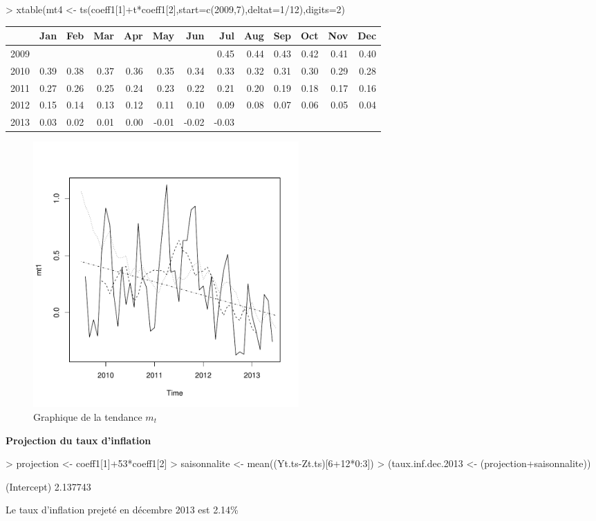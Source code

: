 \documentclass{article}
\begin{document}
\begin{Schunk}
\begin{Sinput}
> xtable(mt4 <- ts(coeff1[1]+t*coeff1[2],start=c(2009,7),deltat=1/12),digits=2)
\end{Sinput}
\begin{table}[ht]
\centering
\begin{tabular}{rrrrrrrrrrrrr}
  \hline
 & Jan & Feb & Mar & Apr & May & Jun & Jul & Aug & Sep & Oct & Nov & Dec \\ 
  \hline
2009 &  &  &  &  &  &  & 0.45 & 0.44 & 0.43 & 0.42 & 0.41 & 0.40 \\ 
  2010 & 0.39 & 0.38 & 0.37 & 0.36 & 0.35 & 0.34 & 0.33 & 0.32 & 0.31 & 0.30 & 0.29 & 0.28 \\ 
  2011 & 0.27 & 0.26 & 0.25 & 0.24 & 0.23 & 0.22 & 0.21 & 0.20 & 0.19 & 0.18 & 0.17 & 0.16 \\ 
  2012 & 0.15 & 0.14 & 0.13 & 0.12 & 0.11 & 0.10 & 0.09 & 0.08 & 0.07 & 0.06 & 0.05 & 0.04 \\ 
  2013 & 0.03 & 0.02 & 0.01 & 0.00 & -0.01 & -0.02 & -0.03 &  &  &  &  &  \\ 
   \hline
\end{tabular}
\end{table}\end{Schunk}
\clearpage 
\begin{figure}[p]
  \centering
  \includegraphics[height=4in, width=4in]{exercice1-graph4.pdf}
  \caption{Graphique de la tendance $m_t$}
  \label{fig:exercice1-graph4}
\end{figure}
\clearpage 
\textbf{Projection du taux d'inflation}
\begin{Schunk}
\begin{Sinput}
> projection <- coeff1[1]+53*coeff1[2]
> saisonnalite <- mean((Yt.ts-Zt.ts)[6+12*0:3])
> (taux.inf.dec.2013 <- (projection+saisonnalite))
\end{Sinput}
\begin{Soutput}
(Intercept) 
   2.137743 
\end{Soutput}
\end{Schunk}
Le taux d'inflation prejeté en décembre 2013 est 2.14\%\\
\end{document}
